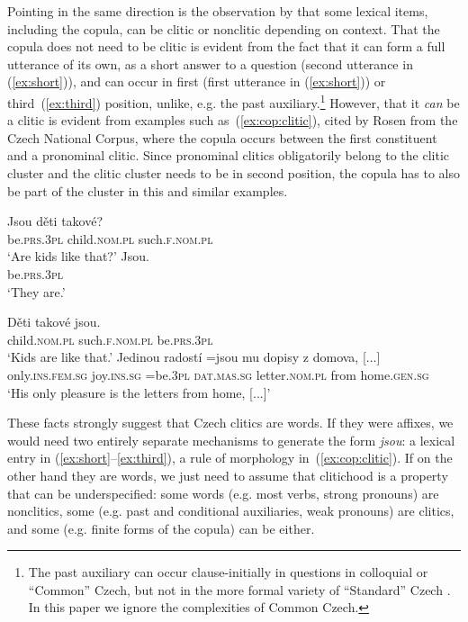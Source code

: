 \documentclass[output=paper]{langsci/langscibook}
\begin{document}
Pointing in the same direction is the observation by \citet[210]{Rosen01} that some lexical items, including the copula, can be clitic or nonclitic depending on context. That the copula does not need to be clitic is evident from the fact that it can form a full utterance of its own, as a short answer to a question (second utterance in (\ref{ex:short})), and can occur in first (first utterance  in (\ref{ex:short})) or third~(\ref{ex:third}) position, unlike, e.g. the past auxiliary.\footnote{The past auxiliary can occur clause-initially in questions in colloquial or ``Common'' Czech, but not in the more formal variety of ``Standard'' Czech \citep[70]{Hana07}. In this paper we ignore the complexities of Common Czech.} However, that it \emph{can} be a clitic is evident from examples such as~(\ref{ex:cop:clitic}), cited by Rosen from the Czech National Corpus, where the copula occurs between the first constituent and a pronominal clitic. Since pronominal clitics obligatorily belong to the clitic cluster and the clitic cluster needs to be in second position, the copula has to also be part of the cluster in this and similar examples.

\begin{exe}
\ex\label{ex:short}\begin{xlist}
\gll Jsou děti  takové?\\ 
be.\textsc{prs.3pl} child.\textsc{nom.pl} such.\textsc{f.nom.pl}\\
\glt `Are kids like that?'
\gll Jsou.\\ be.\textsc{prs.3pl}\\ `They are.'
\end{xlist}
\ex\label{ex:third} 
\gll Děti takové jsou.\\
child.\textsc{nom.pl}  such.\textsc{f.nom.pl} be.\textsc{prs.3pl}\\
\glt `Kids are like that.'
\ex\label{ex:cop:clitic}\gll
Jedinou radostí =jsou mu dopisy z domova, [...]\\
only.\textsc{ins.fem.sg} joy.\textsc{ins.sg} =be.\textsc{3pl} \textsc{dat.mas.sg} letter.\textsc{nom.pl} from home.\textsc{gen.sg}\\
\glt `His only pleasure is the letters from home, [...]’
\end{exe}

These facts strongly suggest that Czech clitics are words. If they were  affixes, we would need two entirely separate mechanisms to generate the form \emph{jsou}: a lexical entry in (\ref{ex:short}--\ref{ex:third}), a rule of morphology in~(\ref{ex:cop:clitic}). If on the other hand they are words, we just need to assume that clitichood is a property that can be underspecified: some words (e.g. most verbs, strong pronouns) are nonclitics, some (e.g. past and conditional auxiliaries, weak pronouns) are clitics, and some (e.g. finite forms of the copula) can be either.
\end{document}
